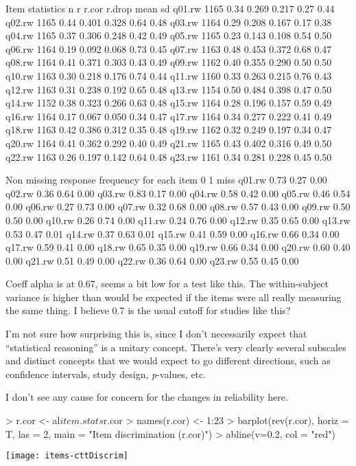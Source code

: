 \documentclass[11pt]{article}
\begin{document}
\begin{Schunk}
\begin{Soutput}
 Item statistics 
          n    r r.cor r.drop mean   sd
q01.rw 1165 0.34 0.269  0.217 0.27 0.44
q02.rw 1165 0.44 0.401  0.328 0.64 0.48
q03.rw 1164 0.29 0.208  0.167 0.17 0.38
q04.rw 1165 0.37 0.306  0.248 0.42 0.49
q05.rw 1165 0.23 0.143  0.108 0.54 0.50
q06.rw 1164 0.19 0.092  0.068 0.73 0.45
q07.rw 1163 0.48 0.453  0.372 0.68 0.47
q08.rw 1164 0.41 0.371  0.303 0.43 0.49
q09.rw 1162 0.40 0.355  0.290 0.50 0.50
q10.rw 1163 0.30 0.218  0.176 0.74 0.44
q11.rw 1160 0.33 0.263  0.215 0.76 0.43
q12.rw 1163 0.31 0.238  0.192 0.65 0.48
q13.rw 1154 0.50 0.484  0.398 0.47 0.50
q14.rw 1152 0.38 0.323  0.266 0.63 0.48
q15.rw 1164 0.28 0.196  0.157 0.59 0.49
q16.rw 1164 0.17 0.067  0.050 0.34 0.47
q17.rw 1164 0.34 0.277  0.222 0.41 0.49
q18.rw 1163 0.42 0.386  0.312 0.35 0.48
q19.rw 1162 0.32 0.249  0.197 0.34 0.47
q20.rw 1164 0.41 0.362  0.292 0.40 0.49
q21.rw 1165 0.43 0.402  0.316 0.49 0.50
q22.rw 1163 0.26 0.197  0.142 0.64 0.48
q23.rw 1161 0.34 0.281  0.228 0.45 0.50

Non missing response frequency for each item
          0    1 miss
q01.rw 0.73 0.27 0.00
q02.rw 0.36 0.64 0.00
q03.rw 0.83 0.17 0.00
q04.rw 0.58 0.42 0.00
q05.rw 0.46 0.54 0.00
q06.rw 0.27 0.73 0.00
q07.rw 0.32 0.68 0.00
q08.rw 0.57 0.43 0.00
q09.rw 0.50 0.50 0.00
q10.rw 0.26 0.74 0.00
q11.rw 0.24 0.76 0.00
q12.rw 0.35 0.65 0.00
q13.rw 0.53 0.47 0.01
q14.rw 0.37 0.63 0.01
q15.rw 0.41 0.59 0.00
q16.rw 0.66 0.34 0.00
q17.rw 0.59 0.41 0.00
q18.rw 0.65 0.35 0.00
q19.rw 0.66 0.34 0.00
q20.rw 0.60 0.40 0.00
q21.rw 0.51 0.49 0.00
q22.rw 0.36 0.64 0.00
q23.rw 0.55 0.45 0.00
\end{Soutput}
\end{Schunk}

Coeff alpha is at 0.67, seems a bit low for a test like this.  The within-subject variance is higher than would be expected if the items were all really measuring the same thing.  I believe 0.7 is the usual cutoff for studies like this?

I'm not sure how surprising this is, since I don't necessarily expect that ``statistical reasoning'' is a unitary concept.  There's very clearly several subscales and distinct concepts that we would expect to go different directions, such as confidence intervals, study design, \emph{p}-values, etc.

I don't see any cause for concern for the changes in reliability here.

\begin{Schunk}
\begin{Sinput}
> r.cor <- al$item.stats$r.cor
> names(r.cor) <- 1:23
> barplot(rev(r.cor), horiz = T, las = 2, main = "Item discrimination (r.cor)")
> abline(v=0.2, col = "red")
\end{Sinput}
\end{Schunk}
\texttt{[image: items-cttDiscrim]}
\end{document}

